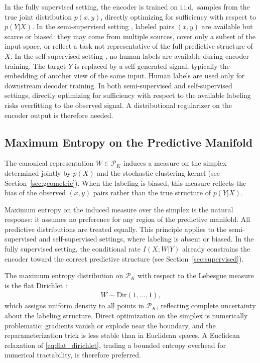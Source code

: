 \documentclass[11pt]{article}
\begin{document}
In the fully supervised setting, the encoder is trained on i.i.d.\ samples
from the true joint distribution $p(x,y)$, directly optimizing for
sufficiency with respect to $p(Y|X)$.
In the semi-supervised setting \cite{vanengelen2020survey}, labeled
pairs $(x,y)$ are available but scarce or biased: they may come from
multiple sources, cover only a subset of the input space, or reflect a
task not representative of the full predictive structure of $X$.
In the self-supervised setting \cite{balestriero2025lejepa}, no human labels are
available during encoder training. The target $Y$ is replaced by a
self-generated signal, typically the embedding of another view of
the same input. Human labels are used only for downstream decoder
training.
In both semi-supervised and self-supervised settings, directly
optimizing for sufficiency with respect to the available labeling
risks overfitting to the observed signal.
A distributional regularizer on the encoder output is therefore needed.

\subsection{Maximum Entropy on the Predictive Manifold}

The canonical representation $W\in\mathcal{P}_K$ induces a measure on
the simplex determined jointly by $p(X)$ and the stochastic clustering
kernel (see Section~\ref{sec:geometric}).
When the labeling is biased, this measure reflects the bias of the
observed $(x,y)$ pairs rather than the true structure of $p(Y|X)$.

Maximum entropy on the induced measure over the simplex is the natural
response: it assumes no preference for any region of the predictive
manifold. All predictive distributions are treated equally.
This principle applies to the semi-supervised and self-supervised
settings, where labeling is absent or biased. In the fully supervised
setting, the conditional rate $I(X;W|Y)$ already constrains the encoder
toward the correct predictive structure (see Section~\ref{sec:supervised}).

The maximum entropy distribution on $\mathcal{P}_K$ with respect to the
Lebesgue measure is the flat Dirichlet \cite{cover2006elements}:
\begin{align}
    W \sim \mathrm{Dir}(1,\ldots,1),
    \label{eq:flat_dirichlet}
\end{align}
which assigns uniform density to all points in $\mathcal{P}_K$,
reflecting complete uncertainty about the labeling structure.
Direct optimization on the simplex is numerically problematic: gradients
vanish or explode near the boundary, and the reparameterization trick
is less stable than in Euclidean spaces.
A Euclidean relaxation of \eqref{eq:flat_dirichlet}, trading a
bounded entropy overhead for numerical tractability, is therefore
preferred.
\end{document}
